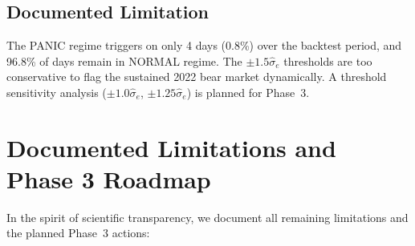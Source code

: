 \documentclass[12pt,a4paper]{article}
\theoremstyle{definition}
\theoremstyle{remark}
\begin{document}
\subsection{Documented Limitation}

The PANIC regime triggers on only 4 days (0.8\%) over the backtest
period, and 96.8\% of days remain in NORMAL regime. The
$\pm 1.5\hat{\sigma}_e$ thresholds are too conservative to flag the
sustained 2022 bear market dynamically. A threshold sensitivity analysis
($\pm 1.0\hat{\sigma}_e$, $\pm 1.25\hat{\sigma}_e$) is planned for
Phase~3.

\section{Documented Limitations and Phase 3 Roadmap}
\label{sec:limitations}

In the spirit of scientific transparency, we document all remaining
limitations and the planned Phase~3 actions:
\end{document}
